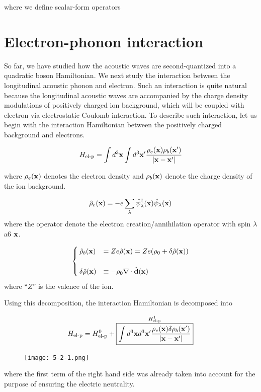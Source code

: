 where we define scalar-form operators





\section{Electron-phonon interaction} \label{se5-2}%

So far, we have studied how the acoustic waves are second-quantized into a quadratic boson Hamiltonian. We next study the interaction between the longitudinal acoustic phonon and electron. Such an interaction is quite natural because the longitudinal acoustic waves are accompanied by the charge density modulations of positively charged ion background, which will be coupled with electron via electrostatic Coulomb interaction. To describe such interaction, let us begin with the interaction Hamiltonian between the positively charged background and electrons. 

\[H_{\text{el-p}}=\int d^3{\bf x}\int d^3{\bf x'}\frac{\rho_e({\bf x})\rho_b({\bf x'})}{|\bf x-x'|} \]

where $\rho_e({\bf x})$ denotes the electron density and $\rho_b({\bf x})$ denote the charge density of the ion background. 

\[\hat{\rho}_e({\bf x}) = -e\sum_\lambda\hat{\psi}_\lambda^\dagger({\bf x})\hat{\psi}_\lambda({\bf x}) \]
where the operator denote the electron creation/annihilation operator with spin $\lambda$ a6 $\bf x$. 

\[\begin{cases}
\hat{\rho}_b({\bf x}) &= Ze\hat{\rho}({\bf x}) = Ze(\rho_0+\delta\hat{\rho}({\bf x}))\\
&\\
\delta\hat{\rho}({\bf x}) &\equiv-\rho_0\nabla\cdot\hat{\bf d}({\bf x})
\end{cases}\]
where ``$Z$'' is the valence of the ion. 

Using this decomposition, the interaction Hamiltonian is decomposed into

\[H_{\text{el-p}} = H_{\text{el-p}}^0 + \overset{H_{\text{el-p}}^1}{\fbox{$\displaystyle\int d^3{\bf x}d^3{\bf x'}\displaystyle\frac{\rho_e({\bf x})\delta\rho_b({\bf x'})}{|\bf x-x'|}$}} \]
\begin{wrapfigure}{r}{6cm}
\texttt{[image: 5-2-1.png]}\
\end{wrapfigure}
where the first term of the right hand side was already taken into account for the purpose of ensuring the electric neutrality. 

